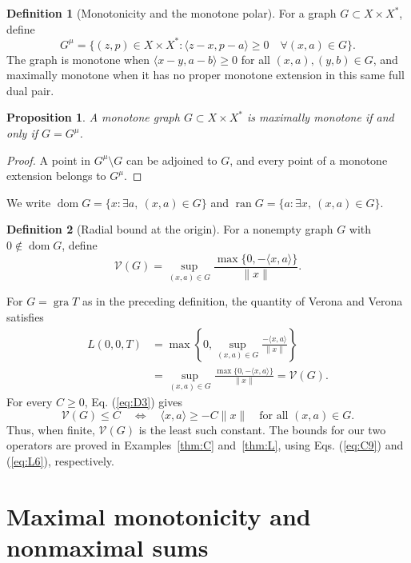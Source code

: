 \documentclass[11pt]{article}
\newcommand{\gra}{\operatorname{gra}}
\newcommand{\dom}{\operatorname{dom}}
\newcommand{\pair}[2]{\langle #1,#2\rangle}
\newtheorem{proposition}{Proposition}
\theoremstyle{definition}
\newtheorem{definition}{Definition}
\theoremstyle{remark}
\begin{document}
\begin{definition}[Monotonicity and the monotone polar]
For a graph $G\subset X\times X^*$, define
\begin{equation}
G^\mu=\{(z,p)\in X\times X^*:
 \pair{z-x}{p-a}\ge0\quad\forall(x,a)\in G\}.
\label{eq:D1}
\end{equation}
The graph is monotone when $\pair{x-y}{a-b}\ge0$ for all $(x,a),(y,b)\in G$, and maximally monotone when it has no proper monotone extension in this same full dual pair.
\end{definition}

\begin{proposition}
A monotone graph $G\subset X\times X^*$ is maximally monotone if and only if $G=G^\mu$.
\end{proposition}
\begin{proof}
A point in $G^\mu\setminus G$ can be adjoined to $G$, and every point of a monotone extension belongs to $G^\mu$.
\end{proof}

We write $\dom G=\{x:\exists a,\ (x,a)\in G\}$ and $\operatorname{ran}G=\{a:\exists x,\ (x,a)\in G\}$.


\begin{definition}[Radial bound at the origin]
For a nonempty graph $G$ with $0\notin\dom G$, define
\begin{equation}
\mathcal V(G)=\sup_{(x,a)\in G}
 \frac{\max\{0,-\pair{x}{a}\}}{\|x\|}.
\label{eq:D3}
\end{equation}
\end{definition}
For $G=\gra T$ as in the preceding definition, the quantity of Verona and Verona \cite[p.~1004]{verona2008} satisfies
\[
\begin{aligned}
L(0,0,T)
&=\max\left\{0,\sup_{(x,a)\in G}\frac{-\pair{x}{a}}{\|x\|}\right\}\\
&=\sup_{(x,a)\in G}\frac{\max\{0,-\pair{x}{a}\}}{\|x\|}
=\mathcal V(G).
\end{aligned}
\]
For every $C\ge0$, Eq. (\ref{eq:D3}) gives
\[
\mathcal V(G)\le C
\quad\Longleftrightarrow\quad
\pair{x}{a}\ge-C\|x\|\quad\text{for all }(x,a)\in G.
\]
Thus, when finite, $\mathcal V(G)$ is the least such constant. The bounds for our two operators are proved in Examples~\ref{thm:C} and~\ref{thm:L}, using Eqs. (\ref{eq:C9}) and (\ref{eq:L6}), respectively.

\section{Maximal monotonicity and nonmaximal sums}
\label{sec:endpoint-criterion}
\end{document}
